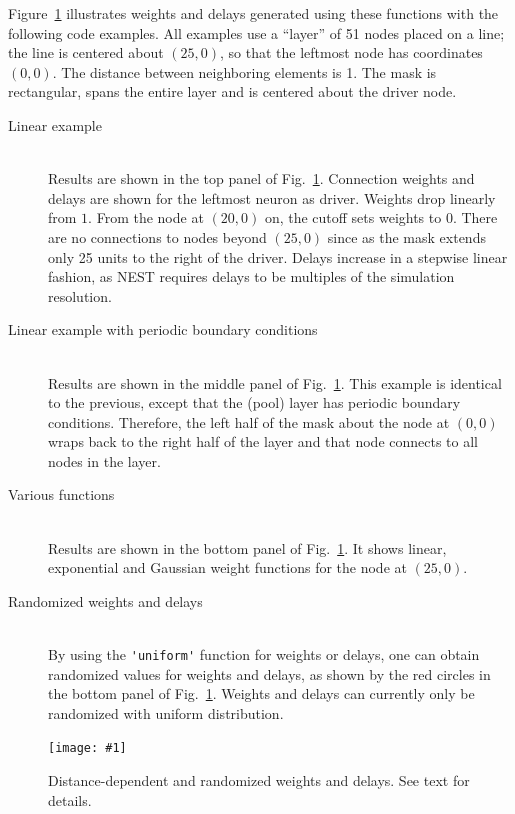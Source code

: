 \documentclass[a4paper,12pt]{report}
\newcommand{\scriptfig}[4]{%
\begin{figure}
\centerline{\texttt{[image: \#1]}}
\caption[#3]{#4}
\label{fig:#1}
\end{figure}%
}
\begin{document}
Figure~\ref{fig:conn5} illustrates weights and delays generated using
these functions with the following code examples. All examples use a
``layer'' of 51 nodes placed on a line; the line is centered about
$(25,0)$, so that the leftmost node has coordinates $(0,0)$. The distance between
neighboring elements is 1. The mask is rectangular, spans the
entire layer and is centered about the driver node.
\begin{description}
\item[Linear example] \rule{0mm}{0mm}\\

Results are shown in the top panel of Fig.~\ref{fig:conn5}.
Connection weights and delays are shown for the leftmost neuron as
driver. Weights drop linearly from $1$. From the node at $(20,0)$ on,
the cutoff sets weights to 0. There are no connections to nodes beyond
$(25,0)$ since as the mask extends only 25 units to the right of the
driver. Delays increase in a stepwise linear fashion, as NEST requires
delays to be multiples of the simulation resolution. 
\item[Linear example with periodic boundary conditions]\rule{0mm}{0mm}\\

Results are shown in the middle panel of Fig.~\ref{fig:conn5}.
This example is identical to the previous,
  except that the (pool) layer has periodic boundary
  conditions. Therefore, the left half of the mask about the node at
  $(0,0)$ wraps back to the right half of the layer and that node
  connects to all nodes in the layer.
\item[Various functions]\rule{0mm}{0mm}\\


Results are shown in the bottom panel of Fig.~\ref{fig:conn5}. It
shows linear, exponential and Gaussian weight functions for the node
at $(25,0)$.
\item[Randomized weights and delays] \rule{0mm}{0mm}\\

By using the \lstinline!'uniform'! function for weights or delays, one
can obtain randomized values for weights and delays, as shown by the
red circles in the bottom panel of Fig.~\ref{fig:conn5}. Weights and
delays can currently only be randomized with uniform distribution.
\end{description}
\scriptfig{conn5}{0.9}{Distance-dependent and randomized weights and
  delays}%
{Distance-dependent and randomized weights and delays. See text for details.}
\end{document}
